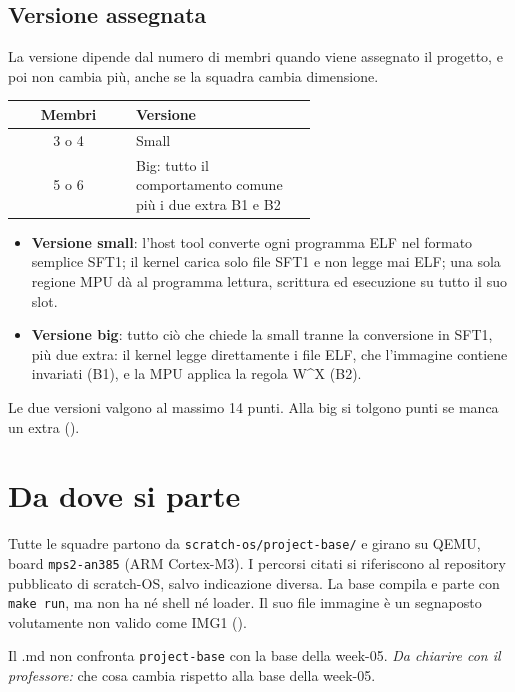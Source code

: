 \subsection{Versione assegnata}

La versione dipende dal numero di membri quando viene assegnato il progetto, e poi non cambia più, anche se la squadra cambia dimensione.

\begin{center}
\begin{tabular}{|c|p{0.6\linewidth}|}
\hline
Membri & \raggedright Versione \tabularnewline
\hline\hline
3 o 4 & \raggedright Small \tabularnewline
\hline
5 o 6 & \raggedright Big: tutto il comportamento comune più i due extra B1 e B2 \tabularnewline
\hline
\end{tabular}
\end{center}

\begin{itemize}
\item \textbf{Versione small}: l'host tool converte ogni programma ELF nel formato semplice SFT1; il kernel carica solo file SFT1 e non legge mai ELF; una sola regione MPU dà al programma lettura, scrittura ed esecuzione su tutto il suo slot.
\item \textbf{Versione big}: tutto ciò che chiede la small tranne la conversione in SFT1, più due extra: il kernel legge direttamente i file ELF, che l'immagine contiene invariati (B1), e la MPU applica la regola W\textasciicircum{}X (B2).
\end{itemize}

Le due versioni valgono al massimo 14 punti. Alla big si tolgono punti se manca un extra ().

\section{Da dove si parte}

\begin{sloppypar}
Tutte le squadre partono da \texttt{scratch-os/project-base/} e girano su QEMU, board \texttt{mps2-an385} (ARM Cortex-M3). I percorsi citati si riferiscono al repository pubblicato di scratch-OS, salvo indicazione diversa. La base compila e parte con \texttt{make run}, ma non ha né shell né loader. Il suo file immagine è un segnaposto volutamente non valido come IMG1 ().
\end{sloppypar}

Il .md non confronta \texttt{project-base} con la base della week-05. \emph{Da chiarire con il professore:} che cosa cambia rispetto alla base della week-05.

